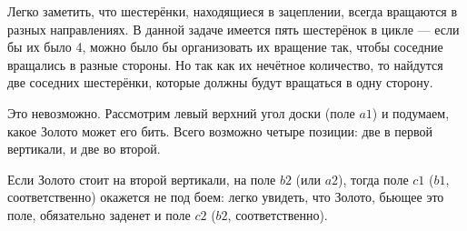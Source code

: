 \begin{itemize}
\itA Легко заметить, что шестерёнки, находящиеся в зацеплении, всегда вращаются в 
разных направлениях. В данной задаче имеется пять шестерёнок в цикле —
если бы их было 4, можно было бы организовать их вращение так, чтобы соседние
вращались в разные стороны. Но так как их нечётное количество, то найдутся две
соседних шестерёнки, которые должны будут вращаться в одну сторону.

\itB 
%
%
Это невозможно. Рассмотрим левый верхний угол доски (поле $a1$) и подумаем, какое
Золото может его бить. Всего возможно четыре позиции: две в первой вертикали, и две во второй.

Если Золото стоит на второй вертикали, на поле $b2$ (или $a2$), тогда поле $c1$ ($b1$, 
соответственно) окажется не под боем: легко увидеть, что Золото, бьющее это поле, обязательно 
заденет и поле $c2$ ($b2$, соответственно).

\begin{center}\end{center}




\end{itemize}
